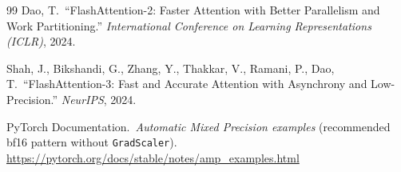 \documentclass[11pt,a4paper]{article}
\begin{document}
\begin{thebibliography}{99}
Dao, T.\
``FlashAttention-2: Faster Attention with Better Parallelism and Work Partitioning.''
\textit{International Conference on Learning Representations (ICLR)}, 2024.

Shah, J., Bikshandi, G., Zhang, Y., Thakkar, V., Ramani, P., Dao, T.\
``FlashAttention-3: Fast and Accurate Attention with Asynchrony and Low-Precision.''
\textit{NeurIPS}, 2024.

PyTorch Documentation.\
\textit{Automatic Mixed Precision examples} (recommended bf16 pattern without
\texttt{GradScaler}). \\
\url{https://pytorch.org/docs/stable/notes/amp_examples.html}

\end{thebibliography}
\end{document}

